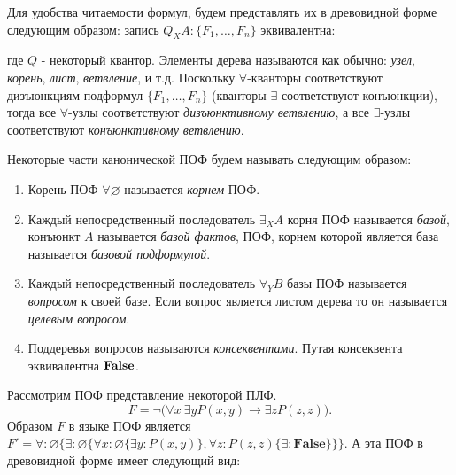 \documentclass[a4paper]{jctart15b}
\begin{document}
Для удобства читаемости формул, будем представлять их в древовидной форме следующим образом: запись $Q_XA\colon\{F_1,\ldots,F_n\}$ эквивалентна:
\begin{center}
\end{center}
\noindent где $Q$ - некоторый квантор. Элементы дерева называются как обычно: \emph{узел}, \emph{корень}, \emph{лист}, \emph{ветвление}, и т.д. Поскольку $\forall$-кванторы соответствуют дизъюнкциям подформул $\{F_1,\ldots,F_n\}$ (кванторы $\exists$ соответствуют конъюнкции), тогда все $\forall$-узлы соответствуют {\em дизъюнктивному ветвлению}, а все $\exists$-узлы соответствуют {\em конъюнктивному ветвлению}.

Некоторые части канонической ПОФ будем называть следующим образом:
\begin{enumerate}
\item Корень ПОФ $\forall \varnothing$ называется {\em корнем} ПОФ.
\item Каждый непосредственный последователь $\exists_XA$ корня ПОФ называется {\em базой}, конъюнкт $A$ называется {\em базой фактов}, ПОФ, корнем которой является база называется {\em базовой подформулой}.
\item Каждый непосредственный последователь $\forall_YB$ базы ПОФ называется {\em вопросом} к своей базе. Если вопрос является листом дерева то он называется {\em целевым вопросом}.
\item Поддеревья вопросов называются {\em консеквентами}. Путая консеквента эквивалентна $\text{\textbf{False}}$.
\end{enumerate}

\begin{example}
Рассмотрим ПОФ представление некоторой ПЛФ.
$$F= \neg\bigl(\forall x\:\exists y P(x,y)\rightarrow \exists z P(z,z)\bigr).$$
Образом $F$ в языке ПОФ является $F' = \forall\colon \varnothing\{\exists\colon\varnothing\{\forall x\colon\varnothing\{\exists y\colon P(x,y)\}, \forall z\colon P(z,z)\{\exists\colon\boldsymbol{False}\}\}\}.$
А эта ПОФ в древовидной форме имеет следующий вид:
\begin{center}
\end{center}
\end{example}
\end{document}
